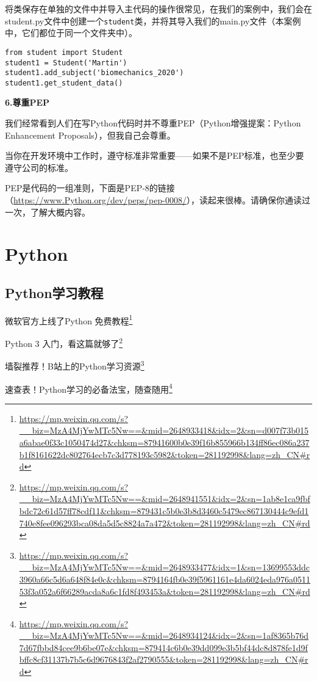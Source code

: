 \documentclass[]{ctexbook}
\renewcommand{\href}[2]{#2\footnote{\url{#1}}}
\begin{document}
将类保存在单独的文件中并导入主代码的操作很常见，在我们的案例中，我们会在student.py文件中创建一个\texttt{student}类，并将其导入我们的main.py文件（本案例中，它们都位于同一个文件夹中）。

\begin{verbatim}
from student import Student
student1 = Student('Martin')
student1.add_subject('biomechanics_2020')
student1.get_student_data()
\end{verbatim}

\textbf{6.尊重PEP}

我们经常看到人们在写Python代码时并不尊重PEP（Python增强提案：Python Enhancement Proposals），但我自己会尊重。

当你在开发环境中工作时，遵守标准非常重要------如果不是PEP标准，也至少要遵守公司的标准。

PEP是代码的一组准则，下面是PEP-8的链接（\url{https://www.Python.org/dev/peps/pep-0008/}），读起来很棒。请确保你通读过一次，了解大概内容。

\hypertarget{python}{%
\section{Python}\label{python}}

\hypertarget{pythonux5b66ux4e60ux6559ux7a0b}{%
\subsection{Python学习教程}\label{pythonux5b66ux4e60ux6559ux7a0b}}

\href{https://mp.weixin.qq.com/s?__biz=MzA4MjYwMTc5Nw==\&mid=2648933418\&idx=2\&sn=d007f73b015a6abae0f33c1050474d27\&chksm=87941600b0e39f16b855966b134ff86ec086a237b1f8161622dc802764ecb7c3d778193c5982\&token=281192998\&lang=zh_CN\#rd}{微软官方上线了Python 免费教程}

\href{https://mp.weixin.qq.com/s?__biz=MzA4MjYwMTc5Nw==\&mid=2648941551\&idx=2\&sn=1ab8e1ca9fbfbdc72c61d57ff78cdf11\&chksm=879431c5b0e3b8d3460c5479ec867130444c9efd1740e8fee096293bca08da5d5c8824a7a472\&token=281192998\&lang=zh_CN\#rd}{Python 3 入门，看这篇就够了}

\href{https://mp.weixin.qq.com/s?__biz=MzA4MjYwMTc5Nw==\&mid=2648933477\&idx=1\&sn=13699553ddc3960a66c5d6a648f84e0c\&chksm=8794164fb0e39f5961161e4da6024eda976a051153f3a052a6f66289acda8a6c1fd8f493453a\&token=281192998\&lang=zh_CN\#rd}{墙裂推荐！B站上的Python学习资源}

\href{https://mp.weixin.qq.com/s?__biz=MzA4MjYwMTc5Nw==\&mid=2648934124\&idx=2\&sn=1af8365b76d7d67fbbd84cee9b6be07e\&chksm=879414c6b0e39dd099e3b5bf44dc8d878fe1d9fbffc8cf31137b7b5c6d9676843f2af2790555\&token=281192998\&lang=zh_CN\#rd}{速查表！Python学习的必备法宝，随查随用}
\end{document}
